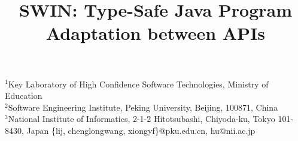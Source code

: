 \documentclass{sigplanconf}
\begin{document}
\setlength{\pdfpageheight}{\paperheight}
\setlength{\pdfpagewidth}{\paperwidth}





\title{SWIN: Type-Safe Java Program Adaptation between APIs}
\subtitle{}

           {$^1$Key Laboratory of High Confidence Software Technologies, Ministry of Education \\
            $^2$Software Engineering Institute, Peking University, Beijing, 100871, China \\
        $^3$National Institute of Informatics, 2-1-2 Hitotsubashi, Chiyoda-ku, Tokyo 101-8430, Japan}
        {\{lij, chenglongwang, xiongyf\}@pku.edu.cn, hu@nii.ac.jp}

\maketitle
\end{document}
